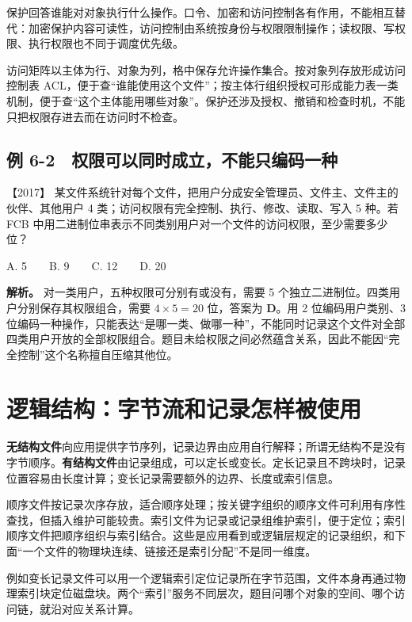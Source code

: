 保护回答谁能对对象执行什么操作。口令、加密和访问控制各有作用，不能相互替代：加密保护内容可读性，访问控制由系统按身份与权限限制操作；读权限、写权限、执行权限也不同于调度优先级。

访问矩阵以主体为行、对象为列，格中保存允许操作集合。按对象列存放形成访问控制表 ACL，便于查``谁能使用这个文件''；按主体行组织授权可形成能力表一类机制，便于查``这个主体能用哪些对象''。保护还涉及授权、撤销和检查时机，不能只把权限存进去而在访问时不检查。

\subsection{例 6-2　权限可以同时成立，不能只编码一种}\label{os-ex6-2}

\noindent{}【2017】 某文件系统针对每个文件，把用户分成安全管理员、文件主、文件主的伙伴、其他用户 4 类；访问权限有完全控制、执行、修改、读取、写入 5 种。若 FCB 中用二进制位串表示不同类别用户对一个文件的访问权限，至少需要多少位？

A. 5　　B. 9　　C. 12　　D. 20


\textbf{解析。} 对一类用户，五种权限可分别有或没有，需要 5 个独立二进制位。四类用户分别保存其权限组合，需要 \(4\times5=20\) 位，答案为 \textbf{D}。用 2 位编码用户类别、3 位编码一种操作，只能表达``是哪一类、做哪一种''，不能同时记录这个文件对全部四类用户开放的全部权限组合。题目未给权限之间必然蕴含关系，因此不能因``完全控制''这个名称擅自压缩其他位。

\section{逻辑结构：字节流和记录怎样被使用}\label{os-6-4}

\textbf{无结构文件}向应用提供字节序列，记录边界由应用自行解释；所谓无结构不是没有字节顺序。\textbf{有结构文件}由记录组成，可以定长或变长。定长记录且不跨块时，记录位置容易由长度计算；变长记录需要额外的边界、长度或索引信息。

顺序文件按记录次序存放，适合顺序处理；按关键字组织的顺序文件可利用有序性查找，但插入维护可能较贵。索引文件为记录或记录组维护索引，便于定位；索引顺序文件把顺序组织与索引结合。这些是应用看到或逻辑层规定的记录组织，和下面``一个文件的物理块连续、链接还是索引分配''不是同一维度。

例如变长记录文件可以用一个逻辑索引定位记录所在字节范围，文件本身再通过物理索引块定位磁盘块。两个``索引''服务不同层次，题目问哪个对象的空间、哪个访问链，就沿对应关系计算。

